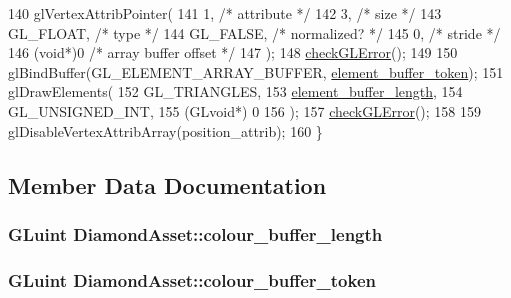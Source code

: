 \begin{DoxyCode}
140   glVertexAttribPointer(
141     1,        \textcolor{comment}{/* attribute */}
142     3,        \textcolor{comment}{/* size */}
143     GL\_FLOAT,   \textcolor{comment}{/* type */}
144     GL\_FALSE,   \textcolor{comment}{/* normalized? */}
145     0,        \textcolor{comment}{/* stride */}
146     (\textcolor{keywordtype}{void}*)0    \textcolor{comment}{/* array buffer offset */}
147   );
148   \hyperlink{DiamondAsset_8cc_a75f201b0e53e68726854997957322b8d}{checkGLError}();
149 
150   glBindBuffer(GL\_ELEMENT\_ARRAY\_BUFFER, \hyperlink{classDiamondAsset_aa2ad44c331156835eba1ed5175bde2e6}{element\_buffer\_token});
151   glDrawElements(
152     GL\_TRIANGLES,
153     \hyperlink{classDiamondAsset_a3fe4461f114f4370a9d800e4425f1c8a}{element\_buffer\_length},
154     GL\_UNSIGNED\_INT,
155     (GLvoid*) 0
156   );
157   \hyperlink{DiamondAsset_8cc_a75f201b0e53e68726854997957322b8d}{checkGLError}();
158 
159   glDisableVertexAttribArray(position\_attrib);
160 \}
\end{DoxyCode}


\subsection{Member Data Documentation}
\hypertarget{classDiamondAsset_a19cc055d55437b1d93bea8e11ddaf845}{}
\subsubsection[{colour\+\_\+buffer\+\_\+length}]{\setlength{\rightskip}{0pt plus 5cm}G\+Luint Diamond\+Asset\+::colour\+\_\+buffer\+\_\+length\hspace{0.3cm}{\ttfamily [private]}}\label{classDiamondAsset_a19cc055d55437b1d93bea8e11ddaf845}
\hypertarget{classDiamondAsset_a500edbd99d521120d7028f3bf4c24743}{}
\subsubsection[{colour\+\_\+buffer\+\_\+token}]{\setlength{\rightskip}{0pt plus 5cm}G\+Luint Diamond\+Asset\+::colour\+\_\+buffer\+\_\+token\hspace{0.3cm}{\ttfamily [private]}}\label{classDiamondAsset_a500edbd99d521120d7028f3bf4c24743}
\hypertarget{classDiamondAsset_a3fe4461f114f4370a9d800e4425f1c8a}{}
